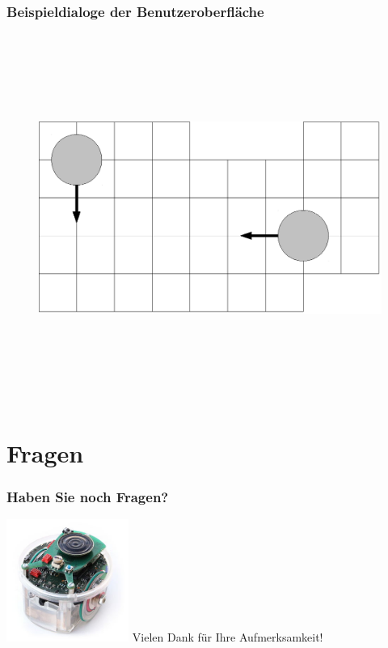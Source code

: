 \documentclass{beamer}
\begin{document}
\begin{frame}
  \frametitle{Beispieldialoge der Benutzeroberfläche}
	\begin{figure}[bp]
		\includegraphics[height=12cm]{karte.eps} 
	\end{figure}
\end{frame}



\section{Fragen}
\begin{frame}
	\frametitle{Haben Sie noch Fragen?}
		\includegraphics[height=4cm]{ende.jpg}
		\vspace{1cm}
	Vielen Dank für Ihre Aufmerksamkeit!
\end{frame}
\end{document}
